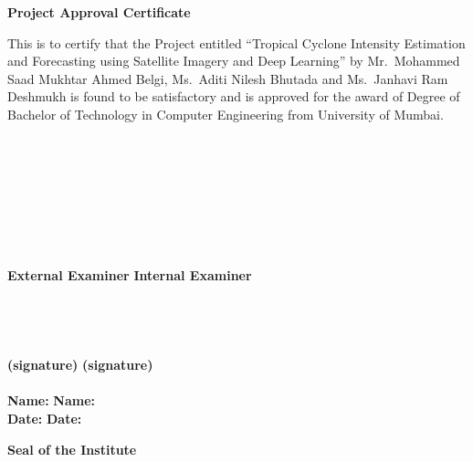 \newpage
\thispagestyle{empty}
\vspace*{0.2cm}
\vspace{1cm}
\begin{center}
 \large\textbf{Project Approval Certificate}
\end{center}
\vspace{2cm}
This is to certify that the Project entitled ``Tropical Cyclone Intensity Estimation and Forecasting using Satellite Imagery and Deep Learning'' by Mr.\ Mohammed Saad Mukhtar Ahmed Belgi, Ms.\ Aditi Nilesh Bhutada and Ms.\ Janhavi Ram Deshmukh is found to be satisfactory and is approved for the award of Degree of Bachelor of Technology in Computer Engineering from University of Mumbai.\\
\\
\\
\\
\\
\\
\\
\\
\\
\textbf {External Examiner} \hspace{2.85in} \textbf{Internal Examiner}\\ 
\\
\\
\\
\\
\textbf {(signature)} \hspace{3.5in} \textbf{(signature)} \\
\\
\vspace{1cm}
\textbf {Name:} \hspace{3.8in} \textbf{Name:}\\ 
\vspace{2cm}
\textbf {Date:} \hspace{3.9in} \textbf{Date:}\\ 
\vspace{2cm}
\begin{center}
\textbf{Seal of the Institute}\\
\end{center}

